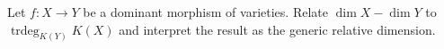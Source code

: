 \begin{problem}\label{chall:vi30-02}
Let $f:X\to Y$ be a dominant morphism of varieties. Relate $\dim X-\dim Y$ to $\operatorname{trdeg}_{K(Y)}K(X)$ and interpret the result as the generic relative dimension.
\end{problem}

